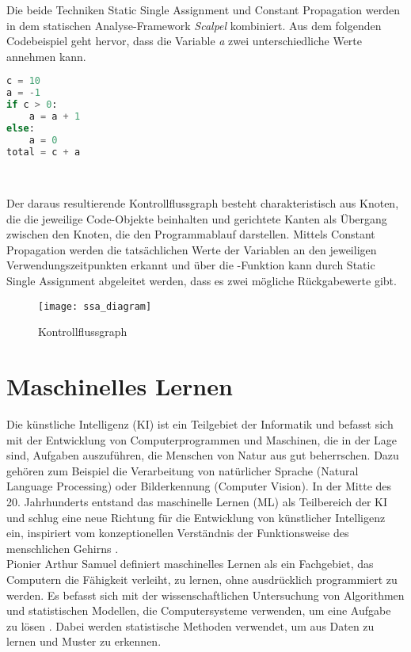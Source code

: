 \documentclass[german,bachelor]{swsLeipzig}
\begin{document}
Die beide Techniken Static Single Assignment und Constant Propagation werden in dem statischen Analyse-Framework
\textit{Scalpel} kombiniert.
Aus dem folgenden Codebeispiel geht hervor, dass die Variable \textit{a} zwei unterschiedliche Werte annehmen kann.\\

\begin{lstlisting}[language=Python, frame=single, basicstyle=\small]
c = 10
a = -1
if c > 0:
    a = a + 1
else:
    a = 0
total = c + a
\end{lstlisting}
\

Der daraus resultierende Kontrollflussgraph besteht charakteristisch aus Knoten, die die jeweilige Code-Objekte beinhalten und gerichtete Kanten als Übergang
zwischen den Knoten, die den Programmablauf darstellen.
Mittels Constant Propagation werden die tatsächlichen Werte der Variablen an den jeweiligen Verwendungszeitpunkten erkannt
und über die \textPhi-Funktion kann durch Static Single Assignment abgeleitet werden, dass es zwei mögliche Rückgabewerte gibt.

\begin{figure}[h]
 \centering
 \texttt{[image: ssa\_diagram]}
 \caption{Kontrollflussgraph \cite[]{li2022scalpel}}
 \label{fig:scalpel}
\end{figure}


\section{Maschinelles Lernen}
Die künstliche Intelligenz (KI) ist ein Teilgebiet der Informatik und befasst sich mit der Entwicklung von Computerprogrammen und Maschinen,
die in der Lage sind, Aufgaben auszuführen, die Menschen von Natur aus gut beherrschen.
Dazu gehören zum Beispiel die Verarbeitung von natürlicher Sprache (Natural Language Processing) oder Bilderkennung (Computer Vision).
In der Mitte des 20. Jahrhunderts entstand das maschinelle Lernen (ML) als Teilbereich der KI und schlug eine neue Richtung
für die Entwicklung von künstlicher Intelligenz ein, inspiriert vom konzeptionellen Verständnis der Funktionsweise des menschlichen Gehirns \cite[]{2020}.\\

Pionier Arthur Samuel definiert maschinelles Lernen als ein Fachgebiet, das Computern die Fähigkeit verleiht, zu lernen,
ohne ausdrücklich programmiert zu werden.
Es befasst sich mit der wissenschaftlichen Untersuchung von Algorithmen und statistischen Modellen,
die Computersysteme verwenden, um eine Aufgabe zu lösen \cite[]{mahesh2020machine}.
Dabei werden statistische Methoden verwendet, um aus Daten zu lernen und Muster zu erkennen. \\
\end{document}
